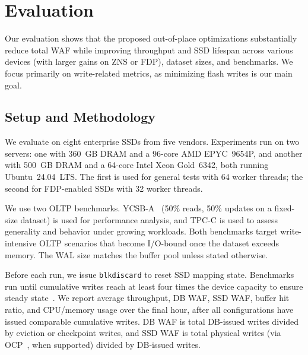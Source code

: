
\section{Evaluation}\label{sec:eval}
Our evaluation shows that the proposed out-of-place optimizations substantially reduce total WAF while improving throughput and SSD lifespan 
across various devices (with larger gains on ZNS or FDP), dataset sizes, and benchmarks.  
We focus primarily on write-related metrics, as minimizing flash writes is our main goal.


\subsection{Setup and Methodology}
We evaluate on eight enterprise SSDs from five vendors.
Experiments run on two servers: one with 360~GB DRAM and a 96-core AMD EPYC~9654P, and another with 500~GB DRAM and a 64-core Intel Xeon Gold~6342, both running Ubuntu~24.04~LTS.
The first is used for general tests with 64 worker threads; the second for FDP-enabled SSDs with 32 worker threads.


We use two OLTP benchmarks.  
YCSB-A~\cite{DBLP:conf/cloud/CooperSTRS10} (50\% reads, 50\% updates on a fixed-size dataset) is used for performance analysis, and TPC-C is used to assess generality and behavior under growing workloads.  
Both benchmarks target write-intensive OLTP scenarios that become I/O-bound once the dataset exceeds memory.  
The WAL size matches the buffer pool unless stated otherwise.

Before each run, we issue \texttt{blkdiscard} to reset SSD mapping state.  
Benchmarks run until cumulative writes reach at least four times the device capacity to ensure steady state~\cite{ssdiq}.  
We report average throughput, DB WAF, SSD WAF, buffer hit ratio, and CPU/memory usage over the final hour, after all configurations have issued comparable cumulative writes.  
DB WAF is total DB-issued writes divided by eviction or checkpoint writes, and SSD WAF is total physical writes (via OCP~\cite{ocp}, when supported) divided by DB-issued writes.

